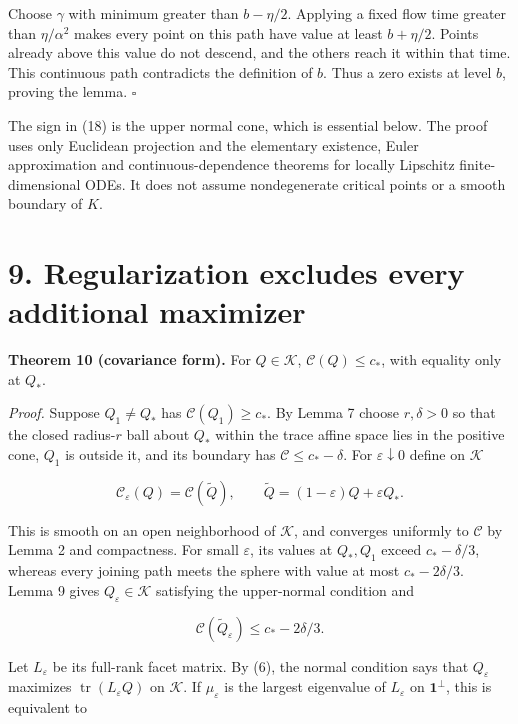 \documentclass[
  11pt,
]{article}
\begin{document}
Choose \(\gamma\) with minimum greater than \(b-\eta/2\). Applying a
fixed flow time greater than \(\eta/\alpha^2\) makes every point on this
path have value at least \(b+\eta/2\). Points already above this value
do not descend, and the others reach it within that time. This
continuous path contradicts the definition of \(b\). Thus a zero exists
at level \(b\), proving the lemma. \(\square\)

The sign in (18) is the upper normal cone, which is essential below. The
proof uses only Euclidean projection and the elementary existence, Euler
approximation and continuous-dependence theorems for locally Lipschitz
finite-dimensional ODEs. It does not assume nondegenerate critical
points or a smooth boundary of \(K\).

\section{9. Regularization excludes every additional
maximizer}\label{regularization-excludes-every-additional-maximizer}

\textbf{Theorem 10 (covariance form).} For \(Q\in\mathcal K\),
\(\mathcal C(Q)\le c_*\), with equality only at \(Q_*\).

\emph{Proof.} Suppose \(Q_1\ne Q_*\) has \(\mathcal C(Q_1)\ge c_*\). By
Lemma 7 choose \(r,\delta>0\) so that the closed radius-\(r\) ball about
\(Q_*\) within the trace affine space lies in the positive cone, \(Q_1\)
is outside it, and its boundary has \(\mathcal C\le c_*-\delta\). For
\(\varepsilon\downarrow0\) define on \(\mathcal K\)

\[
 \mathcal C_\varepsilon(Q)=\mathcal C(\widetilde Q),\qquad
 \widetilde Q=(1-\varepsilon)Q+\varepsilon Q_*.
\]

This is smooth on an open neighborhood of \(\mathcal K\), and converges
uniformly to \(\mathcal C\) by Lemma 2 and compactness. For small
\(\varepsilon\), its values at \(Q_*,Q_1\) exceed \(c_*-\delta/3\),
whereas every joining path meets the sphere with value at most
\(c_*-2\delta/3\). Lemma 9 gives \(Q_\varepsilon\in\mathcal K\)
satisfying the upper-normal condition and

\[
 \mathcal C(\widetilde Q_\varepsilon)\le c_*-2\delta/3.  \tag{19}
\]

Let \(L_\varepsilon\) be its full-rank facet matrix. By (6), the normal
condition says that \(Q_\varepsilon\) maximizes
\(\operatorname{tr}(L_\varepsilon Q)\) on \(\mathcal K\). If
\(\mu_\varepsilon\) is the largest eigenvalue of \(L_\varepsilon\) on
\(\mathbf1^\perp\), this is equivalent to
\end{document}
